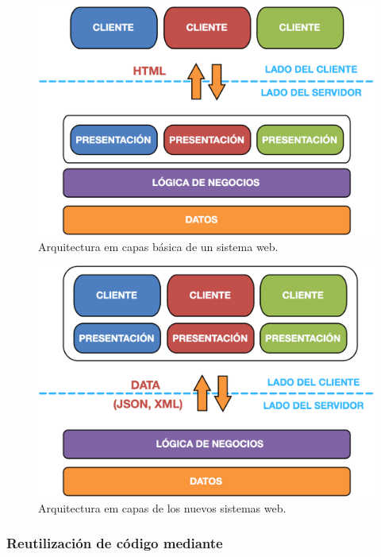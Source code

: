 \begin{figure}[t]
	\centering
	\includegraphics[]{figures/web_arch.png}
	\caption{Arquitectura em capas básica de un sistema web.}
	\label{fig:intro:jvm:web_arch}
\end{figure}

\begin{figure}[t]
	\centering
	\includegraphics[]{figures/new_web_arch.png}
	\caption{Arquitectura em capas de los nuevos sistemas web.}
	\label{fig:intro:jvm:new_web_arch}
\end{figure}

 
\subsubsection{Reutilización de código mediante \dependencies}
\label{susubbsec:intro:jvm_dev:dependencies}

